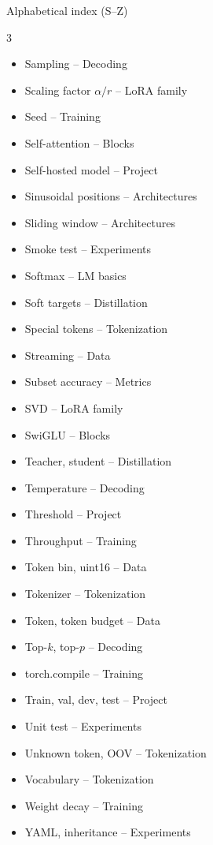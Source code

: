 \documentclass[aspectratio=169,11pt]{beamer}
\begin{document}
\begin{frame}{Alphabetical index (S--Z)}
  \footnotesize
  \begin{multicols}{3}
  \begin{itemize}\setlength{\itemsep}{0pt}
    \item Sampling -- Decoding
    \item Scaling factor $\alpha/r$ -- LoRA family
    \item Seed -- Training
    \item Self-attention -- Blocks
    \item Self-hosted model -- Project
    \item Sinusoidal positions -- Architectures
    \item Sliding window -- Architectures
    \item Smoke test -- Experiments
    \item Softmax -- LM basics
    \item Soft targets -- Distillation
    \item Special tokens -- Tokenization
    \item Streaming -- Data
    \item Subset accuracy -- Metrics
    \item SVD -- LoRA family
    \item SwiGLU -- Blocks
    \item Teacher, student -- Distillation
    \item Temperature -- Decoding
    \item Threshold -- Project
    \item Throughput -- Training
    \item Token bin, uint16 -- Data
    \item Tokenizer -- Tokenization
    \item Token, token budget -- Data
    \item Top-$k$, top-$p$ -- Decoding
    \item torch.compile -- Training
    \item Train, val, dev, test -- Project
    \item Unit test -- Experiments
    \item Unknown token, OOV -- Tokenization
    \item Vocabulary -- Tokenization
    \item Weight decay -- Training
    \item YAML, inheritance -- Experiments
  \end{itemize}
  \end{multicols}
\end{frame}
\end{document}
